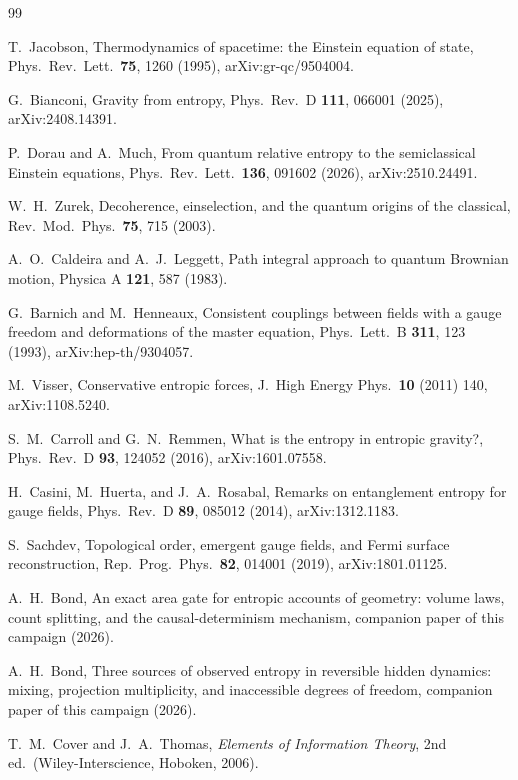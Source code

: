 \documentclass[aps,pre,reprint,nofootinbib]{revtex4-2}
\begin{document}
\begin{thebibliography}{99}

T.~Jacobson,
Thermodynamics of spacetime: the Einstein equation of state,
Phys.\ Rev.\ Lett.\ \textbf{75}, 1260 (1995),
arXiv:gr-qc/9504004.

G.~Bianconi,
Gravity from entropy,
Phys.\ Rev.\ D \textbf{111}, 066001 (2025),
arXiv:2408.14391.

P.~Dorau and A.~Much,
From quantum relative entropy to the semiclassical Einstein equations,
Phys.\ Rev.\ Lett.\ \textbf{136}, 091602 (2026),
arXiv:2510.24491.

W.~H.~Zurek,
Decoherence, einselection, and the quantum origins of the classical,
Rev.\ Mod.\ Phys.\ \textbf{75}, 715 (2003).

A.~O.~Caldeira and A.~J.~Leggett,
Path integral approach to quantum Brownian motion,
Physica A \textbf{121}, 587 (1983).

G.~Barnich and M.~Henneaux,
Consistent couplings between fields with a gauge freedom and
deformations of the master equation,
Phys.\ Lett.\ B \textbf{311}, 123 (1993),
arXiv:hep-th/9304057.

M.~Visser,
Conservative entropic forces,
J.\ High Energy Phys.\ \textbf{10} (2011) 140,
arXiv:1108.5240.

S.~M.~Carroll and G.~N.~Remmen,
What is the entropy in entropic gravity?,
Phys.\ Rev.\ D \textbf{93}, 124052 (2016),
arXiv:1601.07558.

H.~Casini, M.~Huerta, and J.~A.~Rosabal,
Remarks on entanglement entropy for gauge fields,
Phys.\ Rev.\ D \textbf{89}, 085012 (2014),
arXiv:1312.1183.

S.~Sachdev,
Topological order, emergent gauge fields, and Fermi surface
reconstruction,
Rep.\ Prog.\ Phys.\ \textbf{82}, 014001 (2019),
arXiv:1801.01125.

A.~H.~Bond,
An exact area gate for entropic accounts of geometry: volume laws,
count splitting, and the causal-determinism mechanism,
companion paper of this campaign (2026).

A.~H.~Bond,
Three sources of observed entropy in reversible hidden dynamics:
mixing, projection multiplicity, and inaccessible degrees of freedom,
companion paper of this campaign (2026).

T.~M.~Cover and J.~A.~Thomas,
\emph{Elements of Information Theory}, 2nd ed.\
(Wiley-Interscience, Hoboken, 2006).

\end{thebibliography}
\end{document}
